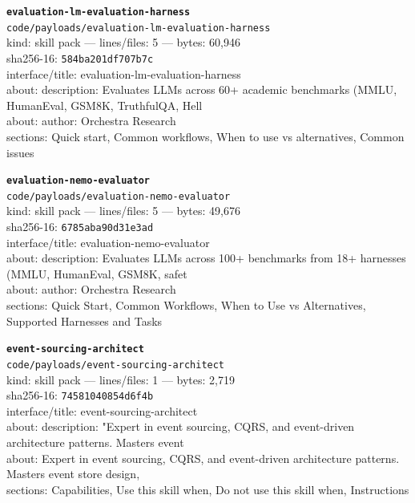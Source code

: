 \noindent\textbf{\texttt{evaluation-lm-evaluation-harness}}\\
\texttt{code/payloads/evaluation-lm-evaluation-harness}\\
kind: skill pack --- lines/files: 5 --- bytes: 60,946\\
sha256-16: \texttt{584ba201df707b7c}\\
interface/title: evaluation-lm-evaluation-harness\\
about: description: Evaluates LLMs across 60+ academic benchmarks (MMLU, HumanEval, GSM8K, TruthfulQA, Hell\\
about: author: Orchestra Research\\
sections: Quick start, Common workflows, When to use vs alternatives, Common issues\\
\vspace*{6.0pt}

\noindent\textbf{\texttt{evaluation-nemo-evaluator}}\\
\texttt{code/payloads/evaluation-nemo-evaluator}\\
kind: skill pack --- lines/files: 5 --- bytes: 49,676\\
sha256-16: \texttt{6785aba90d31e3ad}\\
interface/title: evaluation-nemo-evaluator\\
about: description: Evaluates LLMs across 100+ benchmarks from 18+ harnesses (MMLU, HumanEval, GSM8K, safet\\
about: author: Orchestra Research\\
sections: Quick Start, Common Workflows, When to Use vs Alternatives, Supported Harnesses and Tasks\\
\vspace*{6.0pt}

\noindent\textbf{\texttt{event-sourcing-architect}}\\
\texttt{code/payloads/event-sourcing-architect}\\
kind: skill pack --- lines/files: 1 --- bytes: 2,719\\
sha256-16: \texttt{74581040854d6f4b}\\
interface/title: event-sourcing-architect\\
about: description: "Expert in event sourcing, CQRS, and event-driven architecture patterns. Masters event \\
about: Expert in event sourcing, CQRS, and event-driven architecture patterns. Masters event store design, \\
sections: Capabilities, Use this skill when, Do not use this skill when, Instructions\\
\vspace*{6.0pt}

